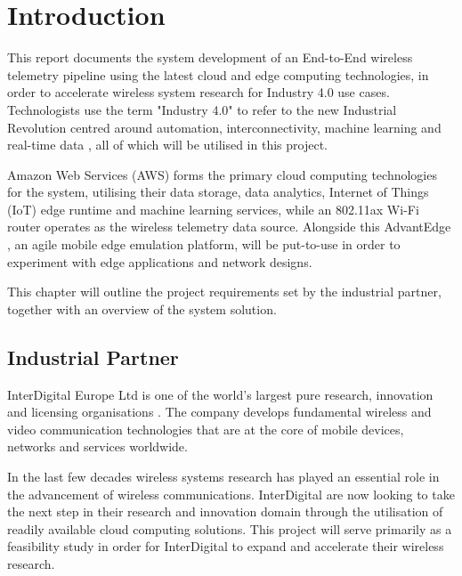 
\chapter{Introduction} \label{Chapter:Introduction}

This report documents the system development of an End-to-End wireless telemetry pipeline using the latest cloud and edge computing technologies, in order to accelerate wireless system research for Industry 4.0 use cases. Technologists use the term "Industry 4.0" to refer to the new Industrial Revolution centred around automation, interconnectivity, machine learning and real-time data \cite{industry4.0}, all of which will be utilised in this project. 

\noindent Amazon Web Services (AWS) forms the primary cloud computing technologies for the system, utilising their data storage, data analytics, Internet of Things (IoT) edge runtime and machine learning services, while an 802.11ax Wi-Fi router operates as the wireless telemetry data source. Alongside this AdvantEdge \cite{AdvantEdge}, an agile mobile edge emulation platform, will be put-to-use in order to experiment with edge applications and network designs.

\noindent This chapter will outline the project requirements set by the industrial partner, together with an overview of the system solution.  

\section{Industrial Partner}

InterDigital Europe Ltd is one of the world's largest pure research, innovation and licensing organisations \cite{interdigitalAbout}. The company develops fundamental wireless and video communication technologies that are at the core of mobile devices, networks and services worldwide. 

\noindent In the last few decades wireless systems research has played an essential role in the advancement of wireless communications. InterDigital are now looking to take the next step in their research and innovation domain through the utilisation of readily available cloud computing solutions. This project will serve primarily as a feasibility study in order for InterDigital to expand and accelerate their wireless research.

